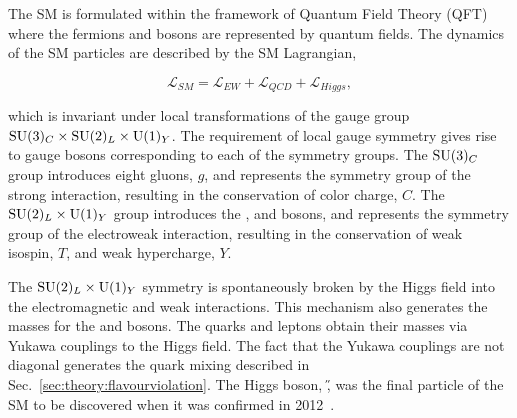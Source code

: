 The SM is formulated within the framework of Quantum Field Theory (QFT) where the fermions and bosons are represented by quantum fields. The dynamics of the SM particles are described by the SM Lagrangian,

\begin{equation}
\mathcal{L}_{SM} = \mathcal{L}_{EW} + \mathcal{L}_{QCD} + \mathcal{L}_{Higgs},
\end{equation}

\noindent which is invariant under local transformations of the gauge group ${\rm SU}(3)_{C} \times {\rm SU}(2)_{L} \times {\rm U}(1)_{Y}$. The requirement of local gauge symmetry gives rise to gauge bosons corresponding to each of the symmetry groups. The ${\rm SU}(3)_{C}$ group introduces eight gluons, $g$, and represents the symmetry group of the strong interaction, resulting in the conservation of color charge, $C$. The ${\rm SU}(2)_{L} \times {\rm U}(1)_{Y}$ group introduces the \Wpm, \Z and \g bosons, and represents the symmetry group of the electroweak interaction, resulting in the conservation of weak isospin, $T$, and weak hypercharge, $Y$. 

The ${\rm SU}(2)_{L} \times {\rm U}(1)_{Y}$ symmetry is spontaneously broken by the Higgs field into the electromagnetic and weak interactions. This mechanism also generates the masses for the \Wpm and \Z bosons. The quarks and leptons obtain their masses via Yukawa couplings to the Higgs field. The fact that the Yukawa couplings are not diagonal generates the quark mixing described in Sec.~\ref{sec:theory:flavourviolation}. The Higgs boson, \H, was the final particle of the SM to be discovered when it was confirmed in 2012~\cite{higgs-atlas,higgs-cms}.




